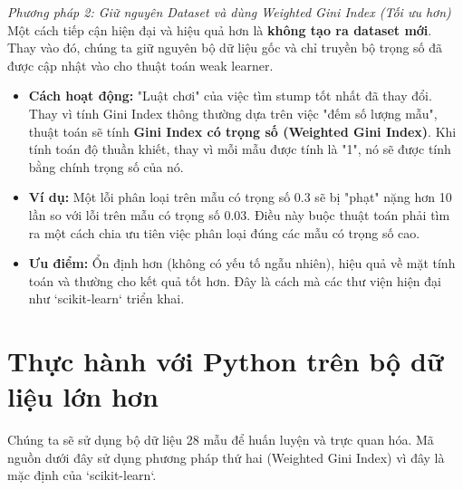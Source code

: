 \textit{Phương pháp 2: Giữ nguyên Dataset và dùng Weighted Gini Index (Tối ưu hơn)} \\
Một cách tiếp cận hiện đại và hiệu quả hơn là \textbf{không tạo ra dataset mới}. Thay vào đó, chúng ta giữ nguyên bộ dữ liệu gốc và chỉ truyền bộ trọng số đã được cập nhật vào cho thuật toán weak learner.
\begin{itemize}
    \item \textbf{Cách hoạt động:} "Luật chơi" của việc tìm stump tốt nhất đã thay đổi. Thay vì tính Gini Index thông thường dựa trên việc "đếm số lượng mẫu", thuật toán sẽ tính \textbf{Gini Index có trọng số (Weighted Gini Index)}. Khi tính toán độ thuần khiết, thay vì mỗi mẫu được tính là "1", nó sẽ được tính bằng chính trọng số của nó.
    \item \textbf{Ví dụ:} Một lỗi phân loại trên mẫu có trọng số 0.3 sẽ bị "phạt" nặng hơn 10 lần so với lỗi trên mẫu có trọng số 0.03. Điều này buộc thuật toán phải tìm ra một cách chia ưu tiên việc phân loại đúng các mẫu có trọng số cao.
    \item \textbf{Ưu điểm:} Ổn định hơn (không có yếu tố ngẫu nhiên), hiệu quả về mặt tính toán và thường cho kết quả tốt hơn. Đây là cách mà các thư viện hiện đại như `scikit-learn` triển khai.
\end{itemize}

\section{Thực hành với Python trên bộ dữ liệu lớn hơn}
Chúng ta sẽ sử dụng bộ dữ liệu 28 mẫu để huấn luyện và trực quan hóa. Mã nguồn dưới đây sử dụng phương pháp thứ hai (Weighted Gini Index) vì đây là mặc định của `scikit-learn`.

